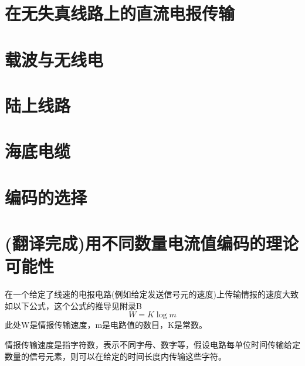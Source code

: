 \documentclass{hfutpaper}
\begin{document}
\section{在无失真线路上的直流电报传输}

\section{载波与无线电}


\section{陆上线路}

\section{海底电缆}

\section{编码的选择}

\section{(翻译完成)用不同数量电流值编码的理论可能性}
在一个给定了线速的电报电路(例如给定发送信号元的速度)上传输情报的速度大致如以下公式，这个公式的推导见附录B
\[W=K\log{m}\]
此处W是情报传输速度，m是电路值的数目，K是常数。\par

情报传输速度是指字符数，表示不同字母、数字等，假设电路每单位时间传输给定数量的信号元素，则可以在给定的时间长度内传输这些字符。
\end{document}

